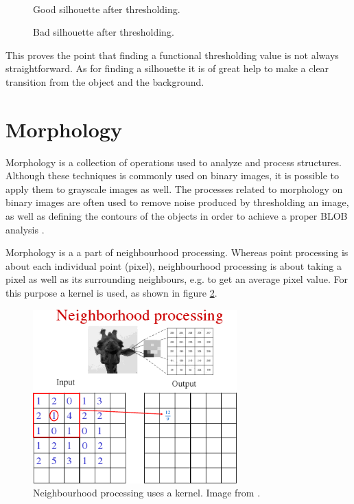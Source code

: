\begin{figure}[htbp]
\begin{minipage}[b]{0.45\textwidth}
\end{minipage} \\ %
\begin{minipage}[t]{0.45\textwidth}
\caption{Good silhouette after thresholding.} %
\label{fig:SimpleThresholdAfter}
\end{minipage} \hfill
\begin{minipage}[t]{0.45\textwidth}
\caption{Bad silhouette after thresholding.} %
\label{fig:ComplicatedThresholdAfter}
\end{minipage}
\end{figure}
 
This proves the point that finding a functional thresholding value is not always straightforward. As for finding a silhouette it is of great help to make a clear transition from the object and the background.

\section{Morphology}
Morphology is a collection of operations used to analyze and process structures. Although these techniques is commonly used on binary images, it is possible to apply them to grayscale images as well. The processes related to morphology on binary images are often used to remove noise produced by thresholding an image, as well as defining the contours of the objects in order to achieve a proper BLOB analysis \citep{ip_book}.

Morphology is a a part of neighbourhood processing. Whereas point processing is about each individual point (pixel), neighbourhood processing is about taking a pixel as well as its surrounding neighbours, e.g. to get an average pixel value. For this purpose a kernel is used, as shown in figure \ref{fig:kernel}.

\begin{figure}[htbp]
\centering
\includegraphics[width=0.7\textwidth]{Pictures/Theory/kernel}
\caption{Neighbourhood processing uses a kernel. Image from \citep{ip_book}.}
\label{fig:kernel}
\end{figure}

